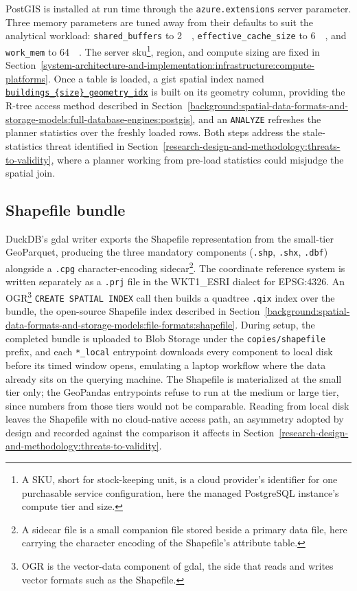 PostGIS is installed at run time through the \texttt{azure.extensions} server parameter. Three memory parameters are tuned away from their defaults to suit the analytical workload: \texttt{shared\_buffers} to \SI{2}{\gibi\byte}, \texttt{effective\_cache\_size} to \SI{6}{\gibi\byte}, and \texttt{work\_mem} to \SI{64}{\mebi\byte}. The server \acrshort{sku}\footnote{A SKU, short for stock-keeping unit, is a cloud provider's identifier for one purchasable service configuration, here the managed PostgreSQL instance's compute tier and size.}, region, and compute sizing are fixed in Section~\ref{system-architecture-and-implementation:infrastructure:compute-platforms}. Once a table is loaded, a \acrshort{gist} spatial index named \texttt{\url{buildings\_{size}\_geometry\_idx}} is built on its geometry column, providing the R-tree access method described in Section~\ref{background:spatial-data-formats-and-storage-models:full-database-engines:postgis}, and an \texttt{ANALYZE} refreshes the planner statistics over the freshly loaded rows. Both steps address the stale-statistics threat identified in Section~\ref{research-design-and-methodology:threats-to-validity}, where a planner working from pre-load statistics could misjudge the spatial join.

\subsection{Shapefile bundle}
\label{system-architecture-and-implementation:data-layer:shapefile-bundle}
DuckDB's \acrshort{gdal} writer exports the Shapefile representation from the small-tier GeoParquet, producing the three mandatory components (\texttt{.shp}, \texttt{.shx}, \texttt{.dbf}) alongside a \texttt{.cpg} character-encoding sidecar\footnote{A sidecar file is a small companion file stored beside a primary data file, here carrying the character encoding of the Shapefile's attribute table.}. The coordinate reference system is written separately as a \texttt{.prj} file in the WKT1\_ESRI dialect for EPSG:4326. An OGR\footnote{OGR is the vector-data component of \acrshort{gdal}, the side that reads and writes vector formats such as the Shapefile.} \texttt{CREATE SPATIAL INDEX} call then builds a quadtree \texttt{.qix} index over the bundle, the open-source Shapefile index described in Section~\ref{background:spatial-data-formats-and-storage-models:file-formats:shapefile}. During setup, the completed bundle is uploaded to Blob Storage under the \texttt{copies/shapefile} prefix, and each \texttt{*\_local} entrypoint downloads every component to local disk before its timed window opens, emulating a laptop workflow where the data already sits on the querying machine. The Shapefile is materialized at the small tier only; the GeoPandas entrypoints refuse to run at the medium or large tier, since numbers from those tiers would not be comparable. Reading from local disk leaves the Shapefile with no cloud-native access path, an asymmetry adopted by design and recorded against the comparison it affects in Section~\ref{research-design-and-methodology:threats-to-validity}.